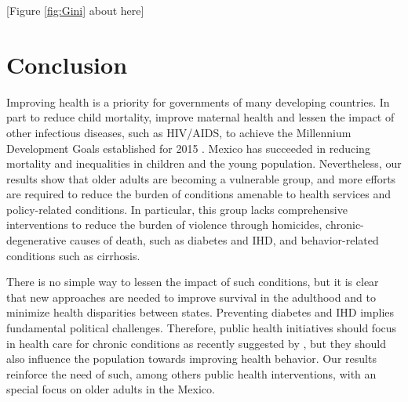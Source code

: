 \documentclass{bmcart}
\begin{document}
\begin{center}
[Figure \ref{fig:Gini} about here]
\end{center}

\section*{Conclusion}
Improving health is a priority for governments of many developing countries. In part to reduce child mortality, improve maternal health and lessen the impact of other infectious diseases, such as HIV/AIDS, to achieve the Millennium Development Goals established for 2015 \cite{united2009millennium}.  Mexico has succeeded in reducing mortality and inequalities in children and the young population. Nevertheless, our results show that older adults are becoming a vulnerable group, and more efforts are required to reduce the burden of conditions amenable to health services and policy-related conditions. In particular, this group lacks comprehensive interventions to reduce the burden of violence through homicides, chronic-degenerative
causes of death, such as diabetes and IHD, and behavior-related conditions such as cirrhosis.  

There is no simple way to lessen the impact of such conditions, but it is clear that new approaches are needed to improve survival in the adulthood and to minimize health disparities between states. Preventing diabetes and IHD implies fundamental political challenges. Therefore,  public health initiatives should focus in health care for chronic conditions as recently suggested by \cite{knaul2015achieving}, but they should also influence the population towards improving health behavior. Our results reinforce the need of such, among others public health interventions, with an special focus on older adults in the Mexico. 


\end{document}

